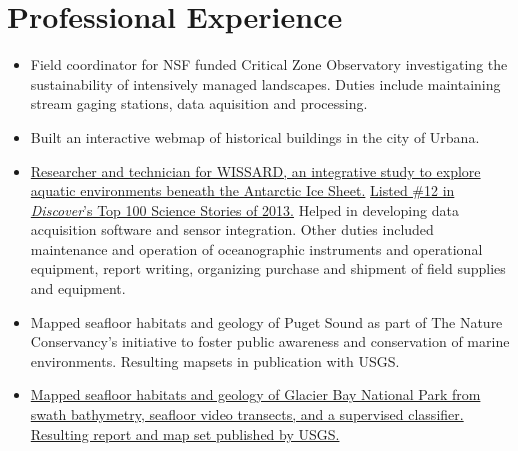 \section{Professional Experience}

\begin{itemize}
\item Field coordinator for NSF funded Critical Zone Observatory investigating the sustainability of intensively managed landscapes. 
  Duties include maintaining stream gaging stations, data aquisition and processing. 
\end{itemize}

\begin{itemize}
\item Built an interactive webmap of historical buildings in the city of Urbana. 

\end{itemize}

\begin{itemize}
\item \href{http://www.wissard.org}{Researcher and technician for WISSARD, an
  integrative study to explore aquatic environments beneath the Antarctic Ice
  Sheet.}
  \href{http://discovermagazine.com/2014/jan-feb/12-the-search-for-life-trapped-under-ice}
       {Listed \#12 in \textit{Discover}'s Top 100 Science Stories of 2013.} Helped in developing data acquisition software and sensor integration.
       Other duties included maintenance and operation of oceanographic instruments and operational equipment,
       report writing, organizing purchase and shipment of field supplies and equipment.
  
\item Mapped seafloor habitats and geology of Puget Sound as part of The Nature
  Conservancy's initiative to foster public awareness and conservation of marine
  environments. Resulting mapsets in publication with USGS.

\item \href{http://pubs.usgs.gov/sim/3253/}{Mapped seafloor habitats and geology
  of Glacier Bay National Park from swath bathymetry, seafloor video transects, and a supervised classifier. Resulting report and map set published by USGS.}
  
\end{itemize}

